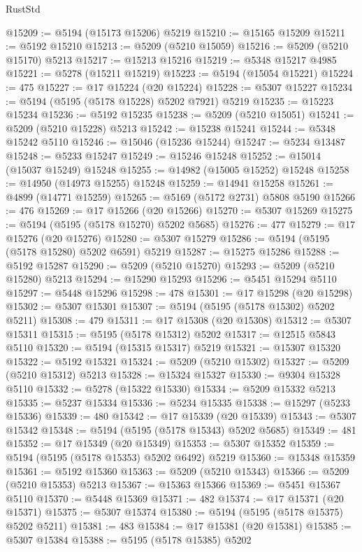 \begin{lexlean}{RustStd}
\begin{coremodule}
@15209 := @5194 (@15173 @15206) @5219
@15210 := @15165 @15209
@15211 := @5192 @15210
@15213 := @5209 (@5210 @15059)
@15216 := @5209 (@5210 @15170) @5213
@15217 := @15213 @15216
@15219 := @5348 @15217 @4985
@15221 := @5278 (@15211 @15219)
@15223 := @5194 (@15054 @15221)
@15224 := 475
@15227 := @17 @15224 (@20 @15224)
@15228 := @5307 @15227
@15234 := @5194 (@5195 (@5178 @15228) @5202 @7921) @5219
@15235 := @15223 @15234
@15236 := @5192 @15235
@15238 := @5209 (@5210 @15051)
@15241 := @5209 (@5210 @15228) @5213
@15242 := @15238 @15241
@15244 := @5348 @15242 @5110
@15246 := @15046 (@15236 @15244)
@15247 := @5234 @13487
@15248 := @5233 @15247
@15249 := @15246 @15248
@15252 := @15014 (@15037 @15249) @15248
@15255 := @14982 (@15005 @15252) @15248
@15258 := @14950 (@14973 @15255) @15248
@15259 := @14941 @15258
@15261 := @4899 (@14771 @15259)
@15265 := @5169 (@5172 @2731) @5808 @5190
@15266 := 476
@15269 := @17 @15266 (@20 @15266)
@15270 := @5307 @15269
@15275 := @5194 (@5195 (@5178 @15270) @5202 @5685)
@15276 := 477
@15279 := @17 @15276 (@20 @15276)
@15280 := @5307 @15279
@15286 := @5194 (@5195 (@5178 @15280) @5202 @6591) @5219
@15287 := @15275 @15286
@15288 := @5192 @15287
@15290 := @5209 (@5210 @15270)
@15293 := @5209 (@5210 @15280) @5213
@15294 := @15290 @15293
@15296 := @5451 @15294 @5110
@15297 := @5448 @15296
@15298 := 478
@15301 := @17 @15298 (@20 @15298)
@15302 := @5307 @15301
@15307 := @5194 (@5195 (@5178 @15302) @5202 @5211)
@15308 := 479
@15311 := @17 @15308 (@20 @15308)
@15312 := @5307 @15311
@15315 := @5195 (@5178 @15312) @5202
@15317 := @12515 @5843 @5110
@15320 := @5194 (@15315 @15317) @5219
@15321 := @15307 @15320
@15322 := @5192 @15321
@15324 := @5209 (@5210 @15302)
@15327 := @5209 (@5210 @15312) @5213
@15328 := @15324 @15327
@15330 := @9304 @15328 @5110
@15332 := @5278 (@15322 @15330)
@15334 := @5209 @15332 @5213
@15335 := @5237 @15334
@15336 := @5234 @15335
@15338 := @15297 (@5233 @15336)
@15339 := 480
@15342 := @17 @15339 (@20 @15339)
@15343 := @5307 @15342
@15348 := @5194 (@5195 (@5178 @15343) @5202 @5685)
@15349 := 481
@15352 := @17 @15349 (@20 @15349)
@15353 := @5307 @15352
@15359 := @5194 (@5195 (@5178 @15353) @5202 @6492) @5219
@15360 := @15348 @15359
@15361 := @5192 @15360
@15363 := @5209 (@5210 @15343)
@15366 := @5209 (@5210 @15353) @5213
@15367 := @15363 @15366
@15369 := @5451 @15367 @5110
@15370 := @5448 @15369
@15371 := 482
@15374 := @17 @15371 (@20 @15371)
@15375 := @5307 @15374
@15380 := @5194 (@5195 (@5178 @15375) @5202 @5211)
@15381 := 483
@15384 := @17 @15381 (@20 @15381)
@15385 := @5307 @15384
@15388 := @5195 (@5178 @15385) @5202

\end{coremodule}
\end{lexlean}
